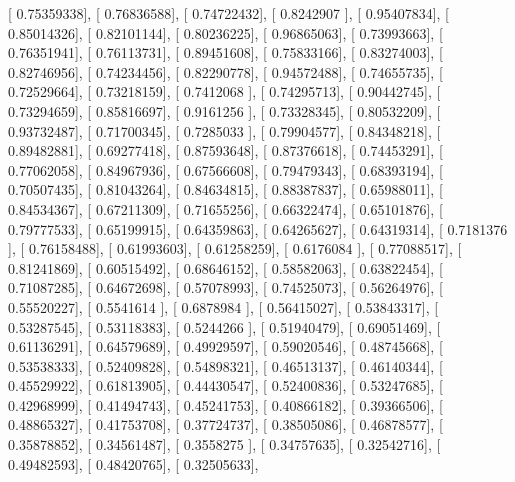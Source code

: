 \documentclass{article}
\begin{document}
       [ 0.75359338],
       [ 0.76836588],
       [ 0.74722432],
       [ 0.8242907 ],
       [ 0.95407834],
       [ 0.85014326],
       [ 0.82101144],
       [ 0.80236225],
       [ 0.96865063],
       [ 0.73993663],
       [ 0.76351941],
       [ 0.76113731],
       [ 0.89451608],
       [ 0.75833166],
       [ 0.83274003],
       [ 0.82746956],
       [ 0.74234456],
       [ 0.82290778],
       [ 0.94572488],
       [ 0.74655735],
       [ 0.72529664],
       [ 0.73218159],
       [ 0.7412068 ],
       [ 0.74295713],
       [ 0.90442745],
       [ 0.73294659],
       [ 0.85816697],
       [ 0.9161256 ],
       [ 0.73328345],
       [ 0.80532209],
       [ 0.93732487],
       [ 0.71700345],
       [ 0.7285033 ],
       [ 0.79904577],
       [ 0.84348218],
       [ 0.89482881],
       [ 0.69277418],
       [ 0.87593648],
       [ 0.87376618],
       [ 0.74453291],
       [ 0.77062058],
       [ 0.84967936],
       [ 0.67566608],
       [ 0.79479343],
       [ 0.68393194],
       [ 0.70507435],
       [ 0.81043264],
       [ 0.84634815],
       [ 0.88387837],
       [ 0.65988011],
       [ 0.84534367],
       [ 0.67211309],
       [ 0.71655256],
       [ 0.66322474],
       [ 0.65101876],
       [ 0.79777533],
       [ 0.65199915],
       [ 0.64359863],
       [ 0.64265627],
       [ 0.64319314],
       [ 0.7181376 ],
       [ 0.76158488],
       [ 0.61993603],
       [ 0.61258259],
       [ 0.6176084 ],
       [ 0.77088517],
       [ 0.81241869],
       [ 0.60515492],
       [ 0.68646152],
       [ 0.58582063],
       [ 0.63822454],
       [ 0.71087285],
       [ 0.64672698],
       [ 0.57078993],
       [ 0.74525073],
       [ 0.56264976],
       [ 0.55520227],
       [ 0.5541614 ],
       [ 0.6878984 ],
       [ 0.56415027],
       [ 0.53843317],
       [ 0.53287545],
       [ 0.53118383],
       [ 0.5244266 ],
       [ 0.51940479],
       [ 0.69051469],
       [ 0.61136291],
       [ 0.64579689],
       [ 0.49929597],
       [ 0.59020546],
       [ 0.48745668],
       [ 0.53538333],
       [ 0.52409828],
       [ 0.54898321],
       [ 0.46513137],
       [ 0.46140344],
       [ 0.45529922],
       [ 0.61813905],
       [ 0.44430547],
       [ 0.52400836],
       [ 0.53247685],
       [ 0.42968999],
       [ 0.41494743],
       [ 0.45241753],
       [ 0.40866182],
       [ 0.39366506],
       [ 0.48865327],
       [ 0.41753708],
       [ 0.37724737],
       [ 0.38505086],
       [ 0.46878577],
       [ 0.35878852],
       [ 0.34561487],
       [ 0.3558275 ],
       [ 0.34757635],
       [ 0.32542716],
       [ 0.49482593],
       [ 0.48420765],
       [ 0.32505633],
\end{document}
